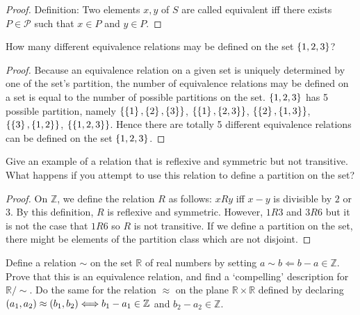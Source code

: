 \begin{proof}
	Definition: Two elements $x, y$ of $S$ are called equivalent iff there exists $P\in \mathscr{P}$ such that $x\in P$ and $y\in P$.
\end{proof}

\begin{exercise}{1.4}
	How many different equivalence relations may be defined on the set $\left\{{1, 2, 3}\right\}$?
\end{exercise}

\begin{proof}
	Because an equivalence relation on a given set is uniquely determined by one of the set's partition, the number of equivalence relations may be defined on a set is equal to the number of possible partitions on the set. $\left\{{1, 2, 3}\right\}$ has 5 possible partition, namely $\left\{{\left\{{1}\right\}, \left\{{2}\right\}, \left\{{3}\right\}}\right\}$, $\left\{{\left\{{1}\right\}, \left\{{2, 3}\right\}}\right\}$, $\left\{{\left\{{2}\right\}, \left\{{1, 3}\right\}}\right\}$, $\left\{{\left\{{3}\right\}, \left\{{1, 2}\right\}}\right\}$, $\left\{{\left\{{1, 2, 3}\right\}}\right\}$. Hence there are totally 5 different equivalence relations can be defined on the set $\left\{{1, 2, 3}\right\}$.
\end{proof}

\begin{exercise}{1.5}
	Give an example of a relation that is reflexive and symmetric but not transitive. What happens if you attempt to use this relation to define a partition on the set?
\end{exercise}

\begin{proof}
	On $\mathbb{Z}$, we define the relation $R$ as follows: $xRy$ iff $x - y$ is divisible by $2$ or $3$. By this definition, $R$ is reflexive and symmetric. However, $1R3$ and $3R6$ but it is not the case that $1R6$ so $R$ is not transitive. If we define a partition on the set, there might be elements of the partition class which are not disjoint.
\end{proof}

\begin{exercise}{1.6}\label{exercise:1-1.6}
	Define a relation $\sim$ on the set $\mathbb{R}$ of real numbers by setting $a\sim b \Longleftarrow b - a\in\mathbb{Z}$. Prove that this is an equivalence relation, and find a `compelling' description for $\mathbb{R}/\sim$. Do the same for the relation $\approx$ on the plane $\mathbb{R}\times\mathbb{R}$ defined by declaring $\left({a_{1}, a_{2}}\right) \approx \left({b_{1}, b_{2}}\right) \Longleftrightarrow b_{1} - a_{1} \in \mathbb{Z}$ and $b_{2} - a_{2}\in\mathbb{Z}$.
\end{exercise}

